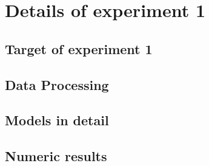 
\chapter{Details of experiment 1} %

\label{Chapter4} %


\section{Target of experiment 1}

\section{Data Processing}

\section{Models in detail}

\section{Numeric results}
